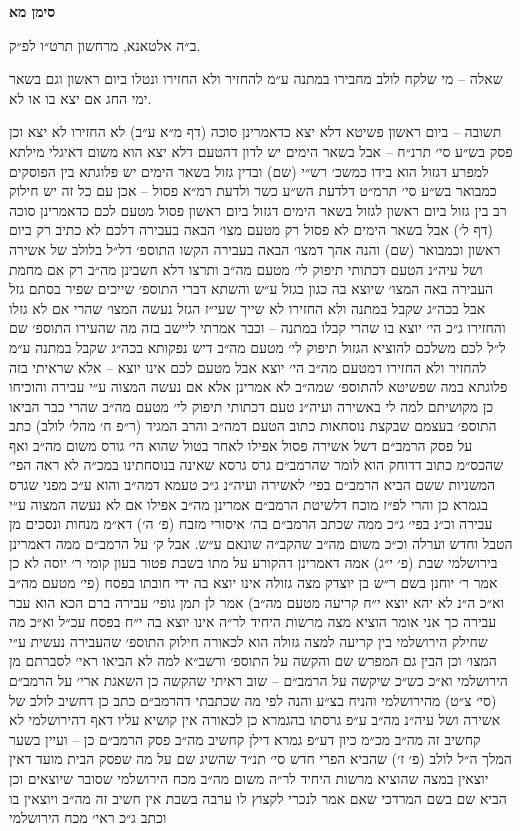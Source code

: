 \documentclass[12pt, openany]{book}
\newcommand{\chapname}{}
\newcommand{\newchap}[1]{
	\addcontentsline{toc}{chapter}{#1}
	\renewcommand{\chapname}{#1}
		\begin{center}
			\textbf{%
\fontsize{16pt}{16pt}\selectfont
				#1}
		\end{center}
}
\begin{document}
\newchap{סימן מא}
\begin{multicols}{2}
ב״ה אלטאנא, מרחשון תרט״ו לפ״ק.\\\vspace{0pt}

שאלה – מי שלקח לולב מחבירו במתנה ע״מ להחזיר ולא החזירו ונטלו ביום ראשון וגם בשאר ימי החג אם יצא בו או לא.\\\vspace{0pt}

תשובה – ביום ראשון פשיטא דלא יצא כדאמרינן סוכה (דף מ״א ע״ב) לא החזירו לא יצא וכן פסק בש״ע סי׳ תרנ״ח – אבל בשאר הימים יש לדון דהטעם דלא יצא הוא משום דאיגלי מילתא למפרע דגזול הוא בידו כמשכ׳ רש״י (שם) ובדין גזול בשאר הימים יש פלוגתא בין הפוסקים כמבואר בש״ע סי׳ תרמ״ט דלדעת הש״ע כשר ולדעת רמ״א פסול – אכן עם כל זה יש חילוק רב בין גזול ביום ראשון לגזול בשאר הימים דגזול ביום ראשון פסול מטעם לכם כדאמרינן סוכה (דף ל׳) אבל בשאר הימים לא פסול רק מטעם מצו׳ הבאה בעבירה דלכם לא כתיב רק ביום ראשון וכמבואר (שם) והנה אהך דמצו׳ הבאה בעבירה הקשו התוספ׳ דל״ל בלולב של אשירה ושל עיה״נ הטעם דכתותי תיפוק לי׳ מטעם מה״ב ותרצו דלא חשבינן מה״ב רק אם מחמת העבירה באה המצו׳ שיוצא בה כגון בגזל ע״ש והשתא דברי התוספ׳ שייכים שפיר בסתם גזל אבל בכה״ג שקבל במתנה ולא החזירו לא שייך שעי״ז הגזל נעשה המצו׳ שהרי אם לא גזלו והחזירו ג״כ הי׳ יוצא בו שהרי קבלו במתנה – וכבר אמרתי ליישב בזה מה שהעירו התוספ׳ שם ל״ל לכם משלכם להוציא הגזול תיפוק לי׳ מטעם מה״ב דיש נפקותא בכה״ג שקבל במתנה ע״מ להחזיר ולא החזירו דמטעם מה״ב הי׳ יוצא אבל מטעם לכם אינו יוצא – אלא שראיתי בזה פלוגתא במה שפשיטא להתוספ׳ שמה״ב לא אמרינן אלא אם נעשה המצוה ע״י עבירה והוכיחו כן מקושיתם למה לי באשירה ועיה״נ טעם דכתותי תיפוק לי׳ מטעם מה״ב שהרי כבר הביאו התוספ׳ בעצמם שבקצת נוסחאות כתוב הטעם דמה״ב והרב המגיד (ר״פ ח׳ מהל׳ לולב) כתב על פסק הרמב״ם דשל אשירה פסול אפילו לאחר בטול שהוא הי׳ גורס משום מה״ב ואף שהכס״מ כתוב דדוחק הוא לומר שהרמב״ם גרס גרסא שאינה בנוסחתינו במכ״ה לא ראה הפי׳ המשניות ששם הביא הרמב״ם בפי׳ לאשירה ועיה״נ ג״כ טעמא דמה״ב והוא ע״כ מפני שגרס בגמרא כן והרי לפ״ז מוכח דלשיטת הרמב״ם אמרינן מה״ב אפילו אם לא נעשה המצוה ע״י עבירה וכ״נ בפי׳ ג״כ ממה שכתב הרמב״ם בה׳ איסורי מזבח (פ׳ ה׳) דא״מ מנחות ונסכים מן הטבל וחדש וערלה וכ״כ משום מה״ב שהקב״ה שונאם ע״ש. אבל ק׳ על הרמב״ם ממה דאמרינן בירושלמי שבת (פ׳ י״ג) אמה דאמרינן דהקורע על מתו בשבת פטור בעון קומי ר׳ יוסה לא כן אמר ר׳ יוחנן בשם ר״ש בן יוצדק מצה גזולה אינו יוצא בה ידי חובתו בפסח (פי׳ מטעם מה״ב וא״כ ה״נ לא יהא יוצא י״ח קריעה מטעם מה״ב) אמר לן תמן גופי׳ עבירה ברם הכא הוא עבר עבירה כך אני אומר הוציא מצה מרשות היחיד לר״ה אינו יוצא בה י״ח בפסח עכ״ל וא״כ מה שחילק הירושלמי בין קריעה למצה גזולה הוא לכאורה חילוק התוספ׳ שהעבירה נעשית ע״י המצו׳ וכן הבין גם המפרש שם והקשה על התוספ׳ ורשב״א למה לא הביאו ראי׳ לסברתם מן הירושלמי וא״כ כש״כ שיקשה על הרמב״ם – שוב ראיתי שהקשה כן השאגת ארי׳ על הרמב״ם (סי׳ צ״ט) מהירושלמי והניח בצ״ע והנה לפי מה שכתבתי דהרמב״ם כתב כן דחשיב לולב של אשירה ושל עיה״נ מה״ב ע״פ גרסתו בהגמרא כן לכאורה אין קושיא עליו דאף דהירושלמי לא קחשיב זה מה״ב מכ״מ כיון דע״פ גמרא דילן קחשיב מה״ב פסק הרמב״ם כן – ועיין בשער המלך ה״ל לולב (פ׳ ז׳) שהביא הפרי חדש סי׳ תנ״ד שהשיג שם על מה שפסק הבית מועד דאין יוצאין במצה שהוציא מרשות היחיד לר״ה משום מה״ב מכח הירושלמי שסובר שיוצאים וכן הביא שם בשם המרדכי שאם אמר לנכרי לקצוץ לו ערבה בשבת אין חשיב זה מה״ב ויוצאין בו וכתב ג״כ ראי׳ מכח הירושלמי 
\end{multicols}
\end{document}
